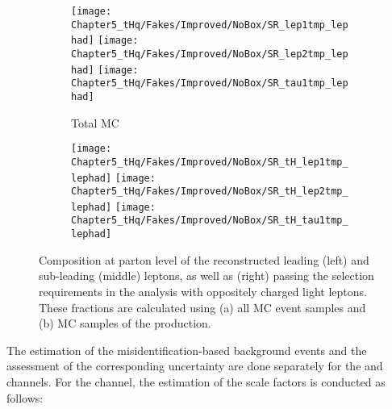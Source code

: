 \begin{figure}[h]
  \begin{subfigure}[b]{\linewidth}
       \centering
       \texttt{[image: Chapter5\_tHq/Fakes/Improved/NoBox/SR\_lep1tmp\_lephad]}
       \texttt{[image: Chapter5\_tHq/Fakes/Improved/NoBox/SR\_lep2tmp\_lephad]}
       \texttt{[image: Chapter5\_tHq/Fakes/Improved/NoBox/SR\_tau1tmp\_lephad]}
       \caption{Total MC}
  \end{subfigure}
  \begin{subfigure}[b]{\linewidth}
      \centering
      \texttt{[image: Chapter5\_tHq/Fakes/Improved/NoBox/SR\_tH\_lep1tmp\_lephad]}
      \texttt{[image: Chapter5\_tHq/Fakes/Improved/NoBox/SR\_tH\_lep2tmp\_lephad]}
      \texttt{[image: Chapter5\_tHq/Fakes/Improved/NoBox/SR\_tH\_tau1tmp\_lephad]}
      \caption{\tHq}
  \end{subfigure}
   \caption{Composition at parton level of the reconstructed leading (left) and sub-leading (middle) leptons, as well as \tauhad (right) passing the selection requirements in the \dileptau analysis with oppositely charged light leptons. These fractions are calculated using (a) all MC event samples and (b) MC samples of the \tHq production.}
   \label{fig:piecharts_dileptau_total_vs_tHq}
\end{figure}



The estimation of the misidentification-based background events and the assessment of the corresponding 
uncertainty are done separately for the \dilepOStau and \dilepSStau channels. For the \dilepOStau channel, the
estimation of the scale factors is conducted as follows:

